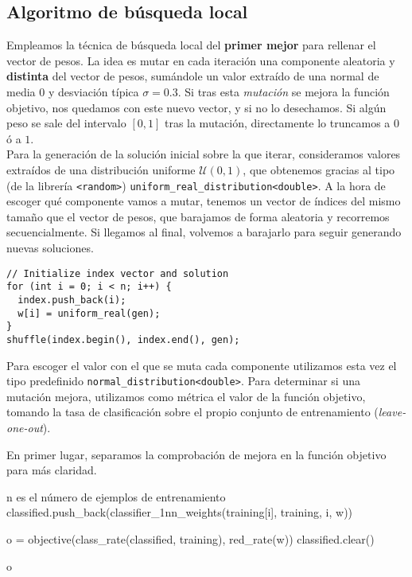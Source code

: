 \documentclass[12pt]{article}
\begin{document}
\subsection*{Algoritmo de búsqueda local}

Empleamos la técnica de búsqueda local del \textbf{primer mejor} para rellenar el vector de pesos. La idea es mutar en cada iteración una componente aleatoria y \textbf{distinta} del vector de pesos, sumándole un valor extraído de una normal de media $0$ y desviación típica $\sigma = 0.3$. Si tras esta \textit{mutación} se mejora la función objetivo, nos quedamos con este nuevo vector, y si no lo desechamos. Si algún peso se sale del intervalo $[0,1]$ tras la mutación, directamente lo truncamos a $0$ ó a $1$.\\

Para la generación de la solución inicial sobre la que iterar, consideramos valores extraídos de una distribución uniforme $\mathcal U(0,1)$, que obtenemos gracias al tipo (de la librería \verb|<random>|) \verb|uniform_real_distribution<double>|. A la hora de escoger qué componente vamos a mutar, tenemos un vector de índices del mismo tamaño que el vector de pesos, que barajamos de forma aleatoria y recorremos secuencialmente. Si llegamos al final, volvemos a barajarlo para seguir generando nuevas soluciones.

\begin{verbatim}
// Initialize index vector and solution
for (int i = 0; i < n; i++) {
  index.push_back(i);
  w[i] = uniform_real(gen);
}
shuffle(index.begin(), index.end(), gen);
\end{verbatim}

Para escoger el valor con el que se muta cada componente utilizamos esta vez el tipo predefinido \verb|normal_distribution<double>|. Para determinar si una mutación mejora, utilizamos como métrica el valor de la función objetivo, tomando la tasa de clasificación sobre el propio conjunto de entrenamiento (\textit{leave-one-out}).

\newpage

En primer lugar, separamos la comprobación de mejora en la función objetivo para más claridad.

\begin{algorithm}[ht]
\begin{algorithmic}

  \Comment n es el número de ejemplos de entrenamiento
    \State classified.push\_back(classifier\_1nn\_weights(training[i], training, i, w))
\EndFor

  \State o = objective(class\_rate(classified, training), red\_rate(w))
  \State classified.clear()
  
\hspace{-.7em} \Return o

\end{algorithmic}
\end{algorithm}
\end{document}
